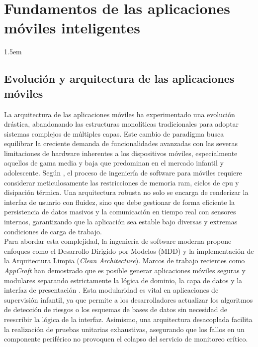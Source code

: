 \chapter{Fundamentos de las aplicaciones móviles inteligentes}
\label{chap:fundamentos-moviles}

\insertminitoc
\parindent1.5em

\section{Evolución y arquitectura de las aplicaciones móviles}

La arquitectura de las aplicaciones móviles ha experimentado una evolución drástica, abandonando las estructuras monolíticas tradicionales para adoptar sistemas complejos de múltiples capas. Este cambio de paradigma busca equilibrar la creciente demanda de funcionalidades avanzadas con las severas limitaciones de hardware inherentes a los dispositivos móviles, especialmente aquellos de gama media y baja que predominan en el mercado infantil y adolescente. Según \cite{koulaxidis_improving_2022}, el proceso de ingeniería de software para móviles requiere considerar meticulosamente las restricciones de memoria \gls{ram}, ciclos de \gls{cpu} y disipación térmica. Una arquitectura robusta no solo se encarga de renderizar la interfaz de usuario con fluidez, sino que debe gestionar de forma eficiente la persistencia de datos masivos y la comunicación en tiempo real con sensores internos, garantizando que la aplicación sea estable bajo diversas y extremas condiciones de carga de trabajo.\\

Para abordar esta complejidad, la ingeniería de software moderna propone enfoques como el Desarrollo Dirigido por Modelos (MDD) y la implementación de la Arquitectura Limpia (\textit{Clean Architecture}). Marcos de trabajo recientes como \textit{AppCraft} han demostrado que es posible generar aplicaciones móviles seguras y modulares separando estrictamente la lógica de dominio, la capa de datos y la interfaz de presentación \cite{alwakeel_appcraft_2025}. Esta modularidad es vital en aplicaciones de supervisión infantil, ya que permite a los desarrolladores actualizar los algoritmos de detección de riesgos o los esquemas de bases de datos sin necesidad de reescribir la lógica de la interfaz. Asimismo, una arquitectura desacoplada facilita la realización de pruebas unitarias exhaustivas, asegurando que los fallos en un componente periférico no provoquen el colapso del servicio de monitoreo crítico.\\



